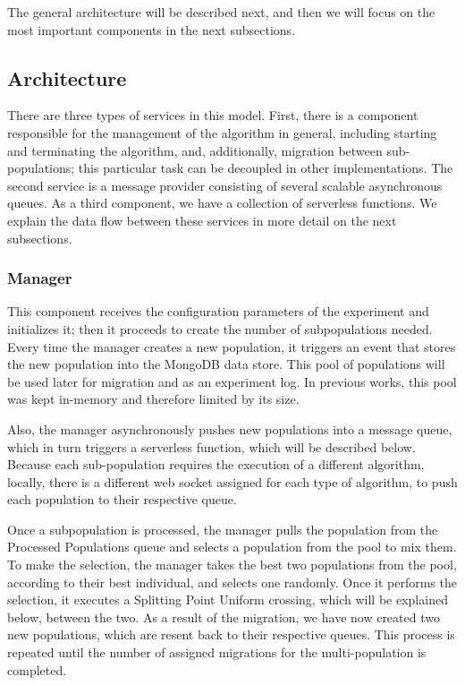 \documentclass[runningheads]{llncs}
\begin{document}
The general architecture will be described next, and then we will
focus on the most important components in the next subsections.

\subsection{Architecture}

There are three types of services in this model. First, there is a component
responsible for the management of the algorithm in general, including
starting and terminating the algorithm, and, additionally, migration between sub-populations; this
particular task can be decoupled in other implementations. The second service is
a message provider consisting of several scalable asynchronous queues. As a
third component, we have a collection of serverless functions. We explain the 
data flow between these services in more detail on the next subsections.  

\subsubsection{Manager}

This component receives the configuration parameters of
  the experiment and initializes it; then it proceeds to create the
  number of subpopulations needed. Every time the manager creates a new
  population, it triggers an event that stores the new population into the
  MongoDB data store. This pool of populations will be used later for migration
  and as an experiment log. In previous works, this pool was kept in-memory and
  therefore limited by its size. 

  Also, the manager asynchronously pushes new populations into a message queue,
  which in turn triggers a serverless function, which will be
  described below. Because each sub-population
  requires the execution of a different algorithm, locally, there is a different
  web socket assigned for each type of algorithm, to push each population to
  their respective queue.

 Once a subpopulation is processed, the manager pulls
  the population from the Processed Populations queue and selects a population
  from the pool to mix them. To make the selection, the manager takes the best
  two populations from the pool, according to their best individual, and selects
  one randomly. Once it performs the selection, it executes a Splitting Point
  Uniform crossing, which will be explained below, between the two. As a result of the migration, we have now created two new
  populations, which are resent back to their respective queues. This process is
  repeated until the number of assigned migrations for the
  multi-population \cite{Ma2019,Santander-jim2018} is completed.
\end{document}
